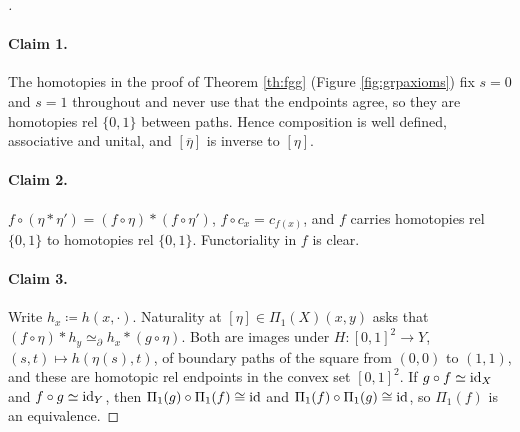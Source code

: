 \begin{proof}[]
  \paragraph{Claim 1.} The homotopies in the proof of Theorem \ref{th:fgg} (Figure \ref{fig:grpaxioms}) fix $s=0$ and $s=1$ throughout and never use that the endpoints agree, so they are homotopies rel $\{0,1\}$ between paths. Hence composition is well defined, associative and unital, and $[\overline\eta]$ is inverse to $[\eta]$.
  \paragraph{Claim 2.} $f\circ(\eta\ast\eta')=(f\circ\eta)\ast(f\circ\eta')$, $f\circ c_x=c_{f(x)}$, and $f$ carries homotopies rel $\{0,1\}$ to homotopies rel $\{0,1\}$. Functoriality in $f$ is clear.
  \paragraph{Claim 3.} Write $h_x\coloneq h(x,\cdot)$. Naturality at $[\eta]\in\Pi_1(X)(x,y)$ asks that $(f\circ\eta)\ast h_y\simeq_\partial h_x\ast(g\circ\eta)$. Both are images under $H:[0,1]^2\to Y$, $(s,t)\mapsto h(\eta(s),t)$, of boundary paths of the square from $(0,0)$ to $(1,1)$, and these are homotopic rel endpoints in the convex set $[0,1]^2$. If $g\circ f\simeq\operatorname{id}_X$ and $f\circ g\simeq\operatorname{id}_Y$, then $\Pi_1(g)\circ\Pi_1(f)\cong\operatorname{id}$ and $\Pi_1(f)\circ\Pi_1(g)\cong\operatorname{id}$, so $\Pi_1(f)$ is an equivalence.
\end{proof}

\newpage

